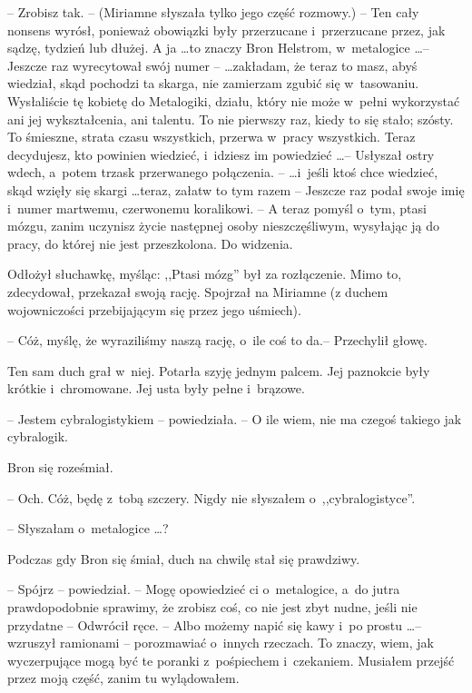 \documentclass[oneside,polish,11pt,rmheadings]{mwbk}
\begin{document}
-- Zrobisz tak. -- (Miriamne słyszała tylko jego część rozmowy.) -- Ten cały nonsens wyrósł, ponieważ obowiązki były przerzucane i~przerzucane przez, jak sądzę, tydzień lub dłużej. A ja \ldots  to znaczy Bron Helstrom, w~metalogice \ldots  -- Jeszcze raz wyrecytował swój numer --   \ldots zakładam, że teraz to masz, abyś wiedział, skąd pochodzi ta skarga, nie zamierzam zgubić się w~tasowaniu. Wysłaliście tę kobietę do Metalogiki, działu, który nie może w~pełni wykorzystać ani jej wykształcenia, ani talentu. To nie pierwszy raz, kiedy to się stało; szósty. To śmieszne, strata czasu wszystkich, przerwa w~pracy wszystkich. Teraz decydujesz, kto powinien wiedzieć, i~idziesz im powiedzieć \ldots  -- Usłyszał ostry wdech, a~potem trzask przerwanego połączenia. -- \ldots i~jeśli ktoś chce wiedzieć, skąd wzięły się skargi \ldots  teraz, załatw to tym razem -- Jeszcze raz podał swoje imię i~numer martwemu, czerwonemu koralikowi. -- A teraz pomyśl o~tym, ptasi mózgu, zanim uczynisz życie następnej osoby nieszczęśliwym, wysyłając ją do pracy, do której nie jest przeszkolona. Do widzenia. 

Odłożył słuchawkę, myśląc: ,,Ptasi mózg'' był za rozłączenie. Mimo to, zdecydował, przekazał swoją rację. Spojrzał na Miriamne (z duchem wojowniczości przebijającym się przez jego uśmiech). 

-- Cóż, myślę, że wyraziliśmy naszą rację, o~ile coś to da.-- Przechylił głowę. 

Ten sam duch grał w~niej. Potarła szyję jednym palcem. Jej paznokcie były krótkie i~chromowane. Jej usta były pełne i~brązowe. 

-- Jestem cybralogistykiem -- powiedziała. -- O ile wiem, nie ma czegoś takiego jak cybralogik. 

Bron się roześmiał. 

-- Och. Cóż, będę z~tobą szczery. Nigdy nie słyszałem o~,,cybralogistyce''. 

-- Słyszałam o~metalogice \ldots ? 

Podczas gdy Bron się śmiał, duch na chwilę stał się prawdziwy. 

-- Spójrz -- powiedział. -- Mogę opowiedzieć ci o~metalogice, a~do jutra prawdopodobnie sprawimy, że zrobisz coś, co nie jest zbyt nudne, jeśli nie przydatne -- Odwrócił ręce. -- Albo możemy napić się kawy i~po prostu \ldots  -- wzruszył ramionami -- porozmawiać o~innych rzeczach. To znaczy, wiem, jak wyczerpujące mogą być te poranki z~pośpiechem i~czekaniem. Musiałem przejść przez moją część, zanim tu wylądowałem. 
\end{document}
